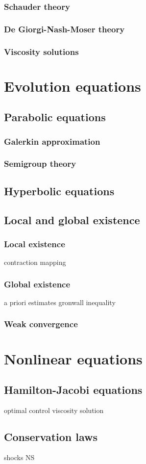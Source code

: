 \documentclass{../note}
\begin{document}
\section{Schauder theory}
\section{De Giorgi-Nash-Moser theory}
\section{Viscosity solutions}








\part{Evolution equations}

\chapter{Parabolic equations}
\section{Galerkin approximation}
\section{Semigroup theory}

\chapter{Hyperbolic equations}

\chapter{Local and global existence}
\section{Local existence}
contraction mapping
\section{Global existence}
a priori estimates
gronwall inequality
\section{Weak convergence}



\part{Nonlinear equations}

\chapter{}

\chapter{Hamilton-Jacobi equations}
optimal control
viscosity solution

\chapter{Conservation laws}
shocks
NS

\
\end{document}
